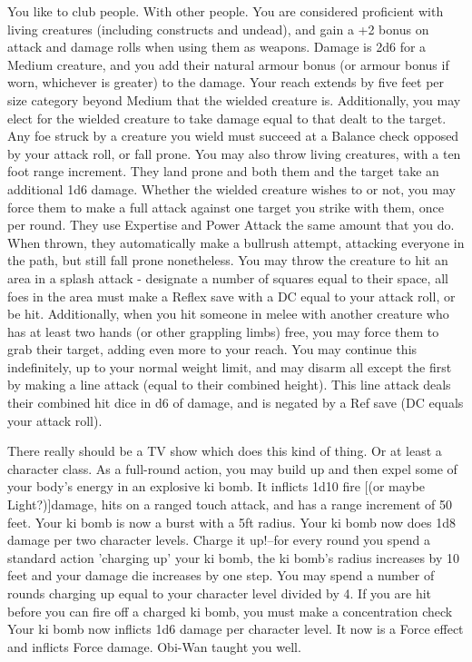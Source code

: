 \begin{multicols}{2}
\label{comm:feat:foewielder}{}
{You like to club people. With other people.
}{You are considered proficient with living creatures (including constructs and undead), and gain a +2 bonus on attack and damage rolls when using them as weapons. Damage is 2d6 for a Medium creature, and you add their natural armour bonus (or armour bonus if worn, whichever is greater) to the damage.
}{Your reach extends by five feet per size category beyond Medium that the wielded creature is. Additionally, you may elect for the wielded creature to take damage equal to that dealt to the target.
}{Any foe struck by a creature you wield must succeed at a Balance check opposed by your attack roll, or fall prone. You may also throw living creatures, with a ten foot range increment. They land prone and both them and the target take an additional 1d6 damage.
}{Whether the wielded creature wishes to or not, you may force them to make a full attack against one target you strike with them, once per round. They use Expertise and Power Attack the same amount that you do. When thrown, they automatically make a bullrush attempt, attacking everyone in the path, but still fall prone nonetheless.
}{You may throw the creature to hit an area in a splash attack - designate a number of squares equal to their space, all foes in the area must make a Reflex save with a DC equal to your attack roll, or be hit. Additionally, when you hit someone in melee with another creature who has at least two hands (or other grappling limbs) free, you may force them to grab their target, adding even more to your reach. You may continue this indefinitely, up to your normal weight limit, and may disarm all except the first by making a line attack (equal to their combined height). This line attack deals their combined hit dice in d6 of damage, and is negated by a Ref save (DC equals your attack roll).}

\label{comm:feat:kibomb}{}
{There really should be a TV show which does this kind of thing. Or at least a character class.
}{As a full-round action, you may build up and then expel some of your body's energy in an explosive ki bomb. It inflicts 1d10 fire [(or maybe Light?)]damage, hits on a ranged touch attack, and has a range increment of 50 feet. 
}{ Your ki bomb is now a burst with a 5ft radius. 
}{Your ki bomb now does 1d8 damage per two character levels. 
}{Charge it up!--for every round you spend a standard action 'charging up' your ki bomb, the ki bomb's radius increases by 10 feet and your damage die increases by one step. You may spend a number of rounds charging up equal to your character level divided by 4. If you are hit before you can fire off a charged ki bomb, you must make a concentration check 
}{Your ki bomb now inflicts 1d6 damage per character level. It now is a Force effect and inflicts Force damage. Obi-Wan taught you well.}


\end{multicols}
